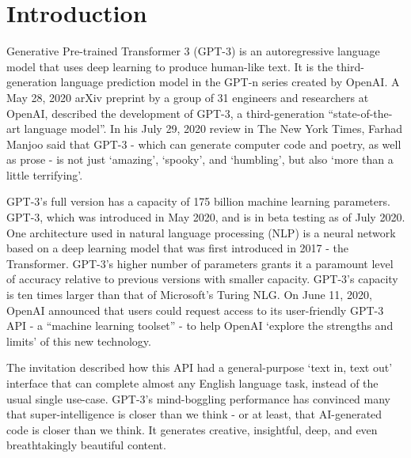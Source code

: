 \chapter*{Introduction}
\label{chap:introduction}
\thispagestyle{fancy}

\hspace{0.5cm} Generative Pre-trained Transformer 3 (GPT-3) is an autoregressive language model that uses deep learning to produce human-like text. It is the third-generation language prediction model in the GPT-n series created by OpenAI\cite{wiki:gpt3}. A May 28, 2020 arXiv preprint by a group of 31 engineers and researchers at OpenAI, described the development of GPT-3, a third-generation ``state-of-the-art language model''. In his July 29, 2020 review in The New York Times, Farhad Manjoo said that GPT-3 - which can generate computer code and poetry, as well as prose - is not just `amazing', `spooky', and `humbling', but also `more than a little terrifying'\cite{art:hhwt}.

GPT-3's full version has a capacity of 175 billion machine learning parameters. GPT-3, which was introduced in May 2020, and is in beta testing as of July 2020\cite{art:wtla}. One architecture used in natural language processing (NLP) is a neural network based on a deep learning model that was first introduced in 2017 - the Transformer\cite{2017arXiv170603762V}. GPT-3's higher number of parameters grants it a paramount level of accuracy relative to previous versions with smaller capacity. GPT-3's capacity is ten times larger than that of Microsoft's Turing NLG. On June 11, 2020, OpenAI announced that users could request access to its user-friendly GPT-3 API - a ``machine learning toolset'' - to help OpenAI `explore the strengths and limits' of this new technology.

The invitation described how this API had a general-purpose `text in, text out' interface that can complete almost any English language task, instead of the usual single use-case. GPT-3's mind-boggling performance has convinced many that super-intelligence is closer than we think - or at least, that AI-generated code is closer than we think. It generates creative, insightful, deep, and even breathtakingly beautiful content\cite{art:wtla}.
\vspace*{\fill}